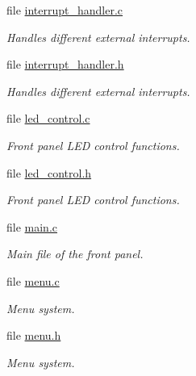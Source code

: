 \begin{CompactItemize}
\item 
file \hyperlink{interrupt__handler_8c}{interrupt\_\-handler.c}
\begin{CompactList}\small\item\em Handles different external interrupts. \item\end{CompactList}

\item 
file \hyperlink{interrupt__handler_8h}{interrupt\_\-handler.h}
\begin{CompactList}\small\item\em Handles different external interrupts. \item\end{CompactList}

\item 
file \hyperlink{front__panel_2led__control_8c}{led\_\-control.c}
\begin{CompactList}\small\item\em Front panel LED control functions. \item\end{CompactList}

\item 
file \hyperlink{front__panel_2led__control_8h}{led\_\-control.h}
\begin{CompactList}\small\item\em Front panel LED control functions. \item\end{CompactList}

\item 
file \hyperlink{front__panel_2main_8c}{main.c}
\begin{CompactList}\small\item\em Main file of the front panel. \item\end{CompactList}

\item 
file \hyperlink{menu_8c}{menu.c}
\begin{CompactList}\small\item\em Menu system. \item\end{CompactList}

\item 
file \hyperlink{menu_8h}{menu.h}
\begin{CompactList}\small\item\em Menu system. \item\end{CompactList}


\end{CompactItemize}
